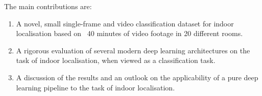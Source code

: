 \documentclass[a4paper]{article}
\begin{document}
The main contributions are:

\begin{enumerate} 

  \item A novel, small single-frame and video classification dataset for indoor
    localisation based on ~40 minutes of video footage in 20 different rooms.

  \item A rigorous evaluation of several modern deep learning architectures on
    the task of indoor localisation, when viewed as a classification task.

  \item A discussion of the results and an outlook on the applicability of a
    pure deep learning pipeline to the task of indoor localisation.

\end{enumerate}

\end{document}
